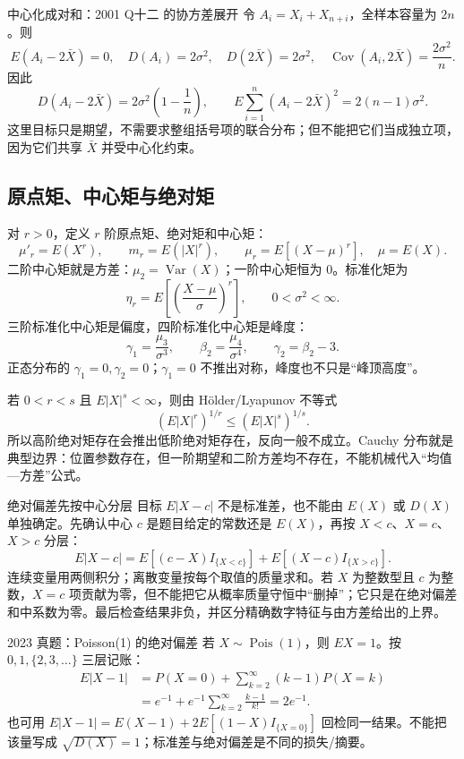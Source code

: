 \documentclass[11pt,a4paper]{ctexart}
\begin{document}
\begin{examplebox}{中心化成对和：2001 Q十二 的协方差展开}
令 $A_i=X_i+X_{n+i}$，全样本容量为 $2n$。则
\[
E(A_i-2\bar X)=0,\quad D(A_i)=2\sigma^2,\quad D(2\bar X)=2\sigma^2,
\quad \operatorname{Cov}(A_i,2\bar X)=\frac{2\sigma^2}{n}.
\]
因此
\[
D(A_i-2\bar X)=2\sigma^2\left(1-\frac1n\right),
\qquad
E\sum_{i=1}^n(A_i-2\bar X)^2=2(n-1)\sigma^2.
\]
这里目标只是期望，不需要求整组括号项的联合分布；但不能把它们当成独立项，因为它们共享 $\bar X$ 并受中心化约束。
\end{examplebox}

\subsection{原点矩、中心矩与绝对矩}

对 $r>0$，定义 $r$ 阶原点矩、绝对矩和中心矩：
\[
\mu'_r=E(X^r),\qquad m_r=E(|X|^r),\qquad
\mu_r=E[(X-\mu)^r],\quad \mu=E(X).
\]
二阶中心矩就是方差：$\mu_2=\operatorname{Var}(X)$；一阶中心矩恒为 $0$。标准化矩为
\[
\eta_r=E\left[\left(\frac{X-\mu}{\sigma}\right)^r\right],\qquad 0<\sigma^2<\infty.
\]
三阶标准化中心矩是偏度，四阶标准化中心矩是峰度：
\[
\gamma_1=\frac{\mu_3}{\sigma^3},\qquad
\beta_2=\frac{\mu_4}{\sigma^4},\qquad \gamma_2=\beta_2-3.
\]
正态分布的 $\gamma_1=0,\gamma_2=0$；$\gamma_1=0$ 不推出对称，峰度也不只是“峰顶高度”。

若 $0<r<s$ 且 $E|X|^s<\infty$，则由 Hölder/Lyapunov 不等式
\[
\left(E|X|^r\right)^{1/r}\leq\left(E|X|^s\right)^{1/s}.
\]
所以高阶绝对矩存在会推出低阶绝对矩存在，反向一般不成立。Cauchy 分布就是典型边界：位置参数存在，但一阶期望和二阶方差均不存在，不能机械代入“均值—方差”公式。

\begin{methodbox}{绝对偏差先按中心分层}
目标 $E|X-c|$ 不是标准差，也不能由 $E(X)$ 或 $D(X)$ 单独确定。先确认中心 $c$ 是题目给定的常数还是 $E(X)$，再按 $X<c$、$X=c$、$X>c$ 分层：
\[
E|X-c|=E[(c-X)I_{\{X<c\}}]+E[(X-c)I_{\{X>c\}}].
\]
连续变量用两侧积分；离散变量按每个取值的质量求和。若 $X$ 为整数型且 $c$ 为整数，$X=c$ 项贡献为零，但不能把它从概率质量守恒中“删掉”；它只是在绝对偏差和中系数为零。最后检查结果非负，并区分精确数字特征与由方差给出的上界。
\end{methodbox}

\begin{examplebox}{2023 真题：Poisson(1) 的绝对偏差}
若 $X\sim\operatorname{Pois}(1)$，则 $EX=1$。按 $0,1,\{2,3,\ldots\}$ 三层记账：
\[
\begin{aligned}
E|X-1|
&=P(X=0)+\sum_{k=2}^{\infty}(k-1)P(X=k)\\
&=e^{-1}+e^{-1}\sum_{k=2}^{\infty}\frac{k-1}{k!}
=2e^{-1}.
\end{aligned}
\]
也可用 $E|X-1|=E(X-1)+2E[(1-X)I_{\{X=0\}}]$ 回检同一结果。不能把该量写成 $\sqrt{D(X)}=1$；标准差与绝对偏差是不同的损失/摘要。
\end{examplebox}
\end{document}
